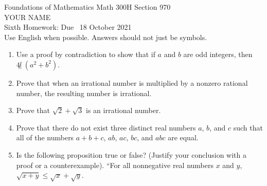 \documentclass[12pt]{article}
\begin{document}
\LARGE 
\noindent
{\color{Maroon}Foundations of Mathematics \hfill Math 300H Section 970}\vspace{2pt}\\
\Large YOUR NAME\vspace{2pt}\\
\large
Sixth Homework: \hfill Due \  18 October 2021\\
Use English when possible.  Answers should not just be symbols.
\normalsize\medskip


\noindent{\color{blue}\rule{500pt}{2pt}}\medskip


\begin{enumerate}  %


\item Use a proof by contradiction to show that if $a$ and $b$ are odd integers, then $4 \not|\ (a^2+b^2)$.

\item Prove that when an irrational number is multiplied by a nonzero rational number, the resulting number is irrational.

\item Prove that $\sqrt{2}+\sqrt{3}$ is an irrational number.

\item Prove that there do not exist three distinct real numbers $a$, $b$, and $c$ such that all of the numbers $a+b+c$,
  $ab$, $ac$, $bc$, and $abc$ are equal.

 \item Is the following proposition true or false?  (Justify your conclusion with a proof or a counterexample).\newline
   ``For all nonnegative real numbers $x$ and $y$, $\sqrt{x+y}\leq\sqrt{x}+\sqrt{y}$.


\end{enumerate}
\end{document}
